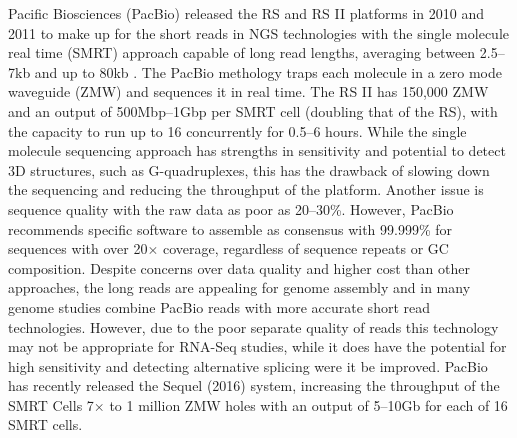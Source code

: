 Pacific Biosciences (PacBio) released the RS and RS II platforms in 2010 and 2011 to make up for the short reads in NGS technologies with the single molecule real time (SMRT) approach capable of long read lengths, averaging between 2.5--7kb and up to 80kb \citet{pacbio}. The PacBio methology traps each molecule in a zero mode waveguide (ZMW) and sequences it in real time. The RS II has 150,000 ZMW and an output of 500Mbp--1Gbp per SMRT cell (doubling that of the RS), with the capacity to run up to 16 concurrently for 0.5--6 hours. While the single molecule sequencing approach has strengths in sensitivity and potential to detect 3D structures, such as G-quadruplexes, this has the drawback of slowing down the sequencing and reducing the throughput of the platform. Another issue is sequence quality with the raw data as poor as 20--30\%. However, PacBio recommends specific software to assemble as consensus with 99.999\% for sequences with over 20$\times$ coverage, regardless of sequence repeats or GC composition. Despite concerns over data quality and higher cost than other approaches, the long reads are appealing for genome assembly and in many genome studies combine PacBio reads with more accurate short read technologies. However, due to the poor separate quality of reads this technology may not be appropriate for RNA-Seq studies, while it does have the potential for high sensitivity and detecting alternative splicing were it be improved. PacBio has recently released the Sequel (2016) system, increasing the throughput of the SMRT Cells 7$\times$ to 1 million ZMW holes with an output of 5--10Gb for each of 16 SMRT cells. 

